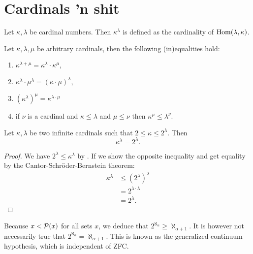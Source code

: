 \section{Cardinals 'n shit}
\begin{definition}
    Let \(\kappa,\lambda\) be cardinal numbers. Then \(\kappa^{\lambda}\) is
    defined as the cardinality of \(\operatorname{Hom}(\lambda,\kappa)\).
\end{definition}

\begin{theorem}
    \label{thm:basic-exp}
    Let \(\kappa,\lambda,\mu\) be arbitrary cardinals, then the following
    (in)equalities hold:
    \begin{enumerate}
        \item \(\kappa^{\lambda+\mu}=\kappa^{\lambda}\cdot\kappa^{\mu}\),
        \item \(\kappa^{\lambda}\cdot\mu^{\lambda}=(\kappa\cdot\mu)^{\lambda}\),
        \item \((\kappa^{\lambda})^{\mu}=\kappa^{\lambda\cdot\mu}\)
        \item if \(\nu\) is a cardinal and \(\kappa\leq\lambda\) and
              \(\mu\leq\nu\) then \(\kappa^{\mu}\leq\lambda^{\nu}\).
    \end{enumerate}
\end{theorem}

\begin{proposition}
    Let \(\kappa,\lambda\) be two infinite cardinals such that
    \(2\leq\kappa\leq 2^{\lambda}\). Then
    \[
        \kappa^{\lambda}=2^{\lambda}.
    \]

    \begin{proof}
        We have \(2^{\lambda}\leq\kappa^{\lambda}\) by . If
        we show the opposite inequality and get equality by the
        Cantor-Schröder-Bernstein theorem:
        \begin{align*}
            \kappa^{\lambda} & \leq (2^{\lambda})^{\lambda} \\
                             & =2^{\lambda\cdot\lambda}     \\
                             & =2^{\lambda}.
        \end{align*}
    \end{proof}
\end{proposition}

Because \(x<\mathcal{P}(x)\) for all sets \(x\), we deduce that
\(2^{\aleph_{\alpha}}\geq\aleph_{\alpha+1}\). It is however not necessarily true
that \(2^{\aleph_{\alpha}}=\aleph_{\alpha+1}\). This is known as the generalized
continuum hypothesis, which is independent of ZFC.

